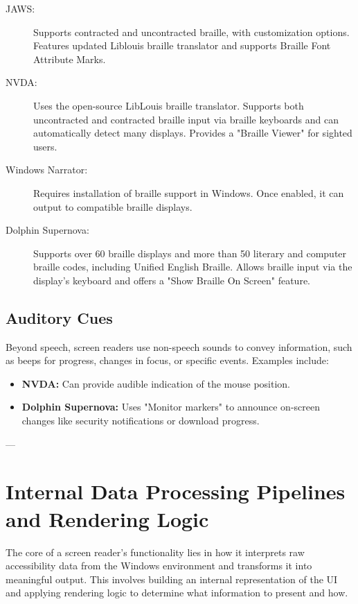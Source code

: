 \begin{description}
    \item[JAWS:] Supports contracted and uncontracted braille, with customization options. Features updated Liblouis braille translator and supports Braille Font Attribute Marks. \cite{JAWSBraille}
    \item[NVDA:] Uses the open-source LibLouis braille translator. Supports both uncontracted and contracted braille input via braille keyboards and can automatically detect many displays. Provides a "Braille Viewer" for sighted users. \cite{NVDABraille}
    \item[Windows Narrator:] Requires installation of braille support in Windows. Once enabled, it can output to compatible braille displays. \cite{NarratorBraille}
    \item[Dolphin Supernova:] Supports over 60 braille displays and more than 50 literary and computer braille codes, including Unified English Braille. Allows braille input via the display's keyboard and offers a "Show Braille On Screen" feature. \cite{SuperNovaBraille}
\end{description}

\subsection{Auditory Cues}
\label{subsec:auditory-cues}
Beyond speech, screen readers use non-speech sounds to convey information, such as beeps for progress, changes in focus, or specific events. Examples include:

\begin{itemize}
    \item \textbf{NVDA:} Can provide audible indication of the mouse position. \cite{NVDASpeech}
    \item \textbf{Dolphin Supernova:} Uses "Monitor markers" to announce on-screen changes like security notifications or download progress. \cite{SuperNovaFeatures}
\end{itemize}

---

\section{Internal Data Processing Pipelines and Rendering Logic}
\label{sec:data-pipelines}

The core of a screen reader's functionality lies in how it interprets raw accessibility data from the Windows environment and transforms it into meaningful output. This involves building an internal representation of the UI and applying rendering logic to determine what information to present and how.

